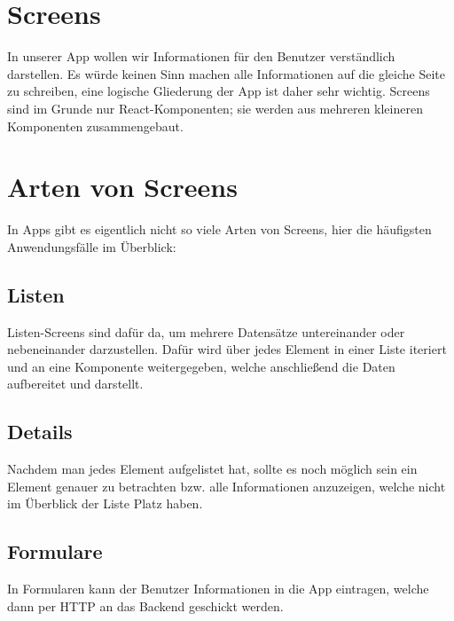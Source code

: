 \section{Screens}
In unserer App wollen wir Informationen für den Benutzer verständlich darstellen. Es würde keinen
Sinn machen alle Informationen auf die gleiche Seite zu schreiben, eine logische Gliederung der App
ist daher sehr wichtig. Screens sind im Grunde nur React-Komponenten; sie werden aus mehreren
kleineren Komponenten zusammengebaut.

\section{Arten von Screens}
In Apps gibt es eigentlich nicht so viele Arten von Screens, hier die häufigsten Anwendungsfälle im
Überblick:

\subsection{Listen}
Listen-Screens sind dafür da, um mehrere Datensätze untereinander oder nebeneinander darzustellen.
Dafür wird über jedes Element in einer Liste iteriert und an eine Komponente weitergegeben, welche
anschließend die Daten aufbereitet und darstellt.

\subsection{Details}
Nachdem man jedes Element aufgelistet hat, sollte es noch möglich sein ein Element genauer zu
betrachten bzw. alle Informationen anzuzeigen, welche nicht im Überblick der Liste Platz haben.

\subsection{Formulare}
In Formularen kann der Benutzer Informationen in die App eintragen, welche dann per HTTP an das
Backend geschickt werden.
